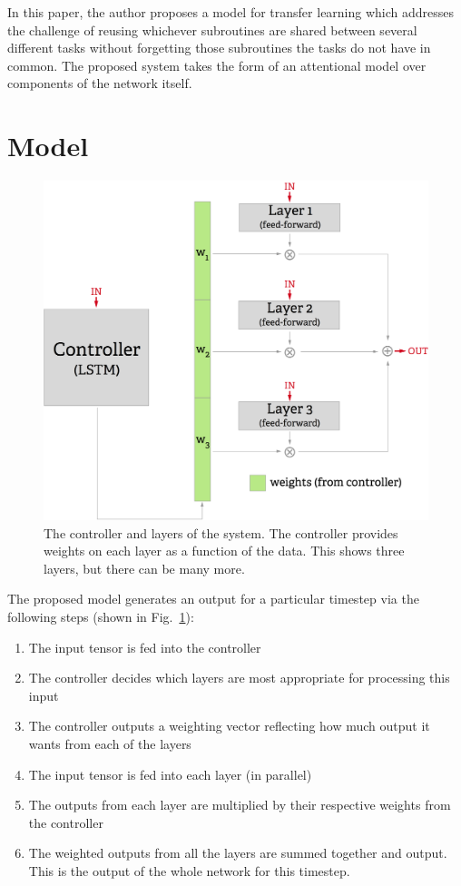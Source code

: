 \documentclass[]{article}
\providecommand{\tightlist}{%
  \setlength{\itemsep}{0pt}\setlength{\parskip}{0pt}}
\begin{document}
In this paper, the author proposes a model for transfer learning which
addresses the challenge of reusing whichever subroutines are shared
between several different tasks without forgetting those subroutines the
tasks do not have in common. The proposed system takes the form of an
attentional model over components of the network itself.

\section{Model}\label{model}

\begin{figure}[htbp]
\centering
\includegraphics{controller_network_small.png}
\caption{\label{fig:controller_network}The controller and layers of the
system. The controller provides weights on each layer as a function of
the data. This shows three layers, but there can be many more.}
\end{figure}

The proposed model generates an output for a particular timestep via the
following steps (shown in Fig.~\ref{fig:controller_network}):

\begin{enumerate}
\def\labelenumi{\arabic{enumi}.}
\tightlist
\item
  The input tensor is fed into the controller
\item
  The controller decides which layers are most appropriate for
  processing this input
\item
  The controller outputs a weighting vector reflecting how much output
  it wants from each of the layers
\item
  The input tensor is fed into each layer (in parallel)
\item
  The outputs from each layer are multiplied by their respective weights
  from the controller
\item
  The weighted outputs from all the layers are summed together and
  output. This is the output of the whole network for this timestep.
\end{enumerate}
\end{document}
